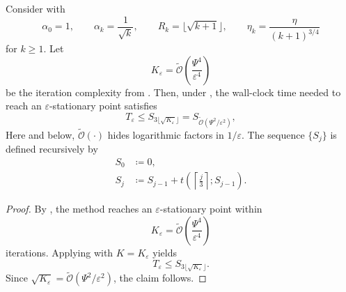 \documentclass{article}
\begin{document}
\begin{theorem}
    \label{thm:time_arbitrary}
    Consider  with
    $$
        \alpha_0 = 1,\qquad
        \alpha_k = \frac{1}{\sqrt{k}},\qquad
        R_k = \lfloor \sqrt{k+1} \rfloor,
        \qquad
        \eta_k = \frac{\eta}{(k+1)^{3/4}}
    $$
    for $k \ge 1$.
    Let
    \begin{equation*}
        K_{\varepsilon}
        =
        \widetilde{\mathcal{O}}\left(\frac{\Psi^4}{\varepsilon^4}\right)
    \end{equation*}
    be the iteration complexity from .
    Then, under , the wall-clock time needed to reach an $\varepsilon$-stationary point satisfies
    \begin{equation*}
        T_{\varepsilon}
        \le
        S_{3\lfloor \sqrt{K_{\varepsilon}} \rfloor}
        =
        S_{\widetilde{\mathcal{O}}(\Psi^2/\varepsilon^2)},
    \end{equation*}
    Here and below, $\widetilde{\mathcal{O}}(\cdot)$ hides logarithmic factors in $1/\varepsilon$.
    The sequence $\{S_j\}$ is defined recursively by
    \begin{align*}
        S_0 &\coloneqq 0, \\
        S_j &\coloneqq S_{j-1} + t\!\left(\left\lceil \frac{j}{3} \right\rceil; S_{j-1}\right).
    \end{align*}
\end{theorem}

\begin{proof}
    By , the method reaches an $\varepsilon$-stationary point within
    \begin{equation*}
        K_{\varepsilon}
        =
        \widetilde{\mathcal{O}}\left(\frac{\Psi^4}{\varepsilon^4}\right)
    \end{equation*}
    iterations.
    Applying  with $K = K_{\varepsilon}$ yields
    \begin{equation*}
        T_{\varepsilon}
        \le
        S_{3\lfloor \sqrt{K_{\varepsilon}} \rfloor}.
    \end{equation*}
    Since $\sqrt{K_{\varepsilon}} = \widetilde{\mathcal{O}}(\Psi^2/\varepsilon^2)$, the claim follows.
\end{proof}
\end{document}
